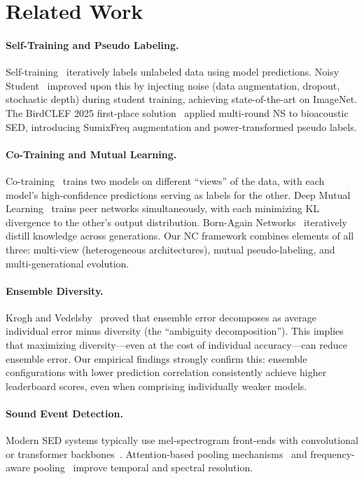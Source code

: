 \documentclass[a4paper]{article}
\begin{document}
\section{Related Work}
\label{sec:related}

\paragraph{Self-Training and Pseudo Labeling.}
Self-training~\citep{yarowsky1995unsupervised} iteratively labels unlabeled data using model predictions.
Noisy Student~\citep{xie2020self} improved upon this by injecting noise (data augmentation, dropout, stochastic depth) during student training, achieving state-of-the-art on ImageNet.
The BirdCLEF 2025 first-place solution~\citep{babych2025} applied multi-round NS to bioacoustic SED, introducing SumixFreq augmentation and power-transformed pseudo labels.

\paragraph{Co-Training and Mutual Learning.}
Co-training~\citep{blum1998combining} trains two models on different ``views'' of the data, with each model's high-confidence predictions serving as labels for the other.
Deep Mutual Learning~\citep{zhang2018deep} trains peer networks simultaneously, with each minimizing KL divergence to the other's output distribution.
Born-Again Networks~\citep{furlanello2018born} iteratively distill knowledge across generations.
Our NC framework combines elements of all three: multi-view (heterogeneous architectures), mutual pseudo-labeling, and multi-generational evolution.

\paragraph{Ensemble Diversity.}
Krogh and Vedelsby~\citep{krogh1994neural} proved that ensemble error decomposes as average individual error minus diversity (the ``ambiguity decomposition'').
This implies that maximizing diversity---even at the cost of individual accuracy---can reduce ensemble error.
Our empirical findings strongly confirm this: ensemble configurations with lower prediction correlation consistently achieve higher leaderboard scores, even when comprising individually weaker models.

\paragraph{Sound Event Detection.}
Modern SED systems typically use mel-spectrogram front-ends with convolutional or transformer backbones~\citep{kong2020panns}.
Attention-based pooling mechanisms~\citep{mcfee2018adaptive} and frequency-aware pooling~\citep{nam2021frequency} improve temporal and spectral resolution.
\end{document}
